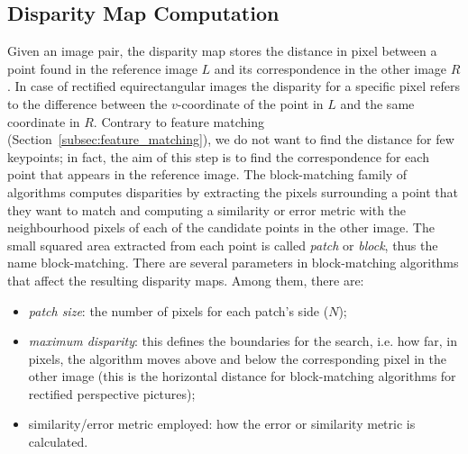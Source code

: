 \subsection{Disparity Map Computation}
\label{subsec:disparityMap}
Given an image pair, the disparity map stores the distance in pixel between 
a point found in the reference image $L$ and its correspondence in the
other image $R$.
In case of rectified equirectangular images the disparity for a specific pixel
refers to the difference between the $v$-coordinate of the point in $L$ and the
same coordinate in $R$.
Contrary to feature matching (Section~\ref{subsec:feature_matching}), we do not
want to find the distance for few keypoints; in fact, the aim of this step is to
find the correspondence for each point that appears in the reference image.
The block-matching family of algorithms computes disparities by extracting the 
pixels surrounding a point that they want to match and computing a similarity
or error metric with the neighbourhood pixels of each of the candidate points
in the other image. The small squared area extracted from each point is called
\emph{patch} or \emph{block}, thus the name block-matching.
There are several parameters in block-matching algorithms that affect the
resulting disparity maps. Among them, there are:
\begin{itemize}
	\item \emph{patch size}: the number of pixels for each patch's side ($N$);
	\item \emph{maximum disparity}: this defines the boundaries for the search,
	i.e. how far, in pixels, the algorithm moves
	above and below the corresponding pixel in the other image (this is the
	horizontal distance for block-matching algorithms for rectified
	perspective pictures);
	\item similarity/error metric employed: how the error or similarity metric
	is calculated.
\end{itemize}

